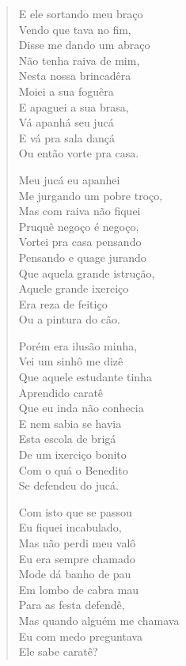 \begin{verse}
E ele sortando meu braço\\
Vendo que tava no fim,\\
Disse me dando um abraço\\
Não tenha raiva de mim,\\
Nesta nossa brincadêra\\
Moiei a sua foguêra\\
E apaguei a sua brasa,\\
Vá apanhá seu jucá\\
E vá pra sala dançá\\
Ou então vorte pra casa.

Meu jucá eu apanhei\\
Me jurgando um pobre troço,\\
Mas com raiva não fiquei\\
Pruquê negoço é negoço,\\
Vortei pra casa pensando\\
Pensando e quage jurando\\
Que aquela grande istrução,\\
Aquele grande ixerciço\\
Era reza de feitiço\\
Ou a pintura do cão.

Porém era ilusão minha,\\
Vei um sinhô me dizê\\
Que aquele estudante tinha\\
Aprendido caratê\\
Que eu inda não conhecia\\
E nem sabia se havia\\
Esta escola de brigá\\
De um ixerciço bonito\\
Com o quá o Benedito\\
Se defendeu do jucá.

Com isto que se passou\\
Eu fiquei incabulado,\\
Mas não perdi meu valô\\
Eu era sempre chamado\\
Mode dá banho de pau\\
Em lombo de cabra mau\\
Para as festa defendê,\\
Mas quando alguém me chamava\\
Eu com medo preguntava\\
Ele sabe caratê?
\end{verse}

